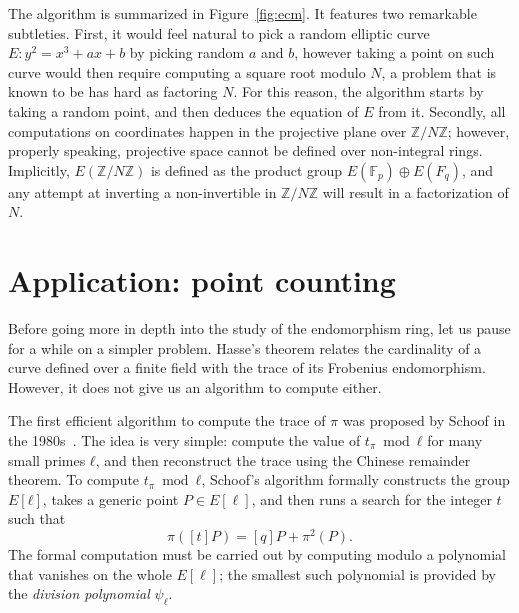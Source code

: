\documentclass[10pt]{article}
\theoremstyle{plain}
\theoremstyle{definition}
\def\F{\ensuremath{\mathbb{F}}}
\begin{document}
The algorithm is summarized in Figure~\ref{fig:ecm}. %
It features two remarkable subtleties. %
First, it would feel natural to pick a random elliptic curve
$E:y^2=x^3+ax+b$ by picking random $a$ and $b$, however taking a point
on such curve would then require computing a square root modulo $N$, a
problem that is known to be has hard as factoring $N$. %
For this reason, the algorithm starts by taking a random point, and
then deduces the equation of $E$ from it. %
Secondly, all computations on coordinates happen in the projective
plane over $ℤ/Nℤ$; however, properly speaking, projective space cannot
be defined over non-integral rings. %
Implicitly, $E(ℤ/Nℤ)$ is defined as the product group
$E(\F_p)⊕E(F_q)$, and any attempt at inverting a non-invertible in
$ℤ/Nℤ$ will result in a factorization of $N$.


\section{Application: point counting}
\label{sec:appl-point-count}

Before going more in depth into the study of the endomorphism ring,
let us pause for a while on a simpler problem. %
Hasse's theorem relates the cardinality of a curve defined over a
finite field with the trace of its Frobenius endomorphism. %
However, it does not give us an algorithm to compute either.

The first efficient algorithm to compute the trace of $π$ was proposed
by Schoof in the 1980s~\cite{schoof85}. %
The idea is very simple: compute the value of $t_π\bmod ℓ$ for many
small primes $ℓ$, and then reconstruct the trace using the Chinese
remainder theorem. %
To compute $t_π\bmod ℓ$, Schoof's algorithm formally constructs the
group $E[ℓ]$, takes a generic point $P∈E[\ell]$, and then runs a
search for the integer $t$ such that
\[π([t]P) = [q]P + π^2(P).\] %
The formal computation must be carried out by computing modulo a
polynomial that vanishes on the whole $E[\ell]$; the smallest such
polynomial is provided by the \emph{division polynomial} $ψ_ℓ$.
\end{document}
